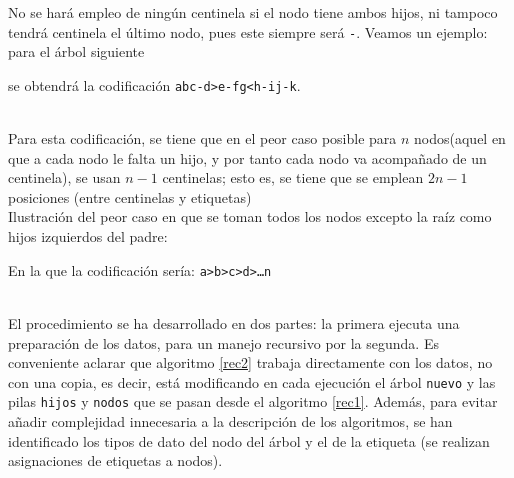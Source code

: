 \documentclass[a4paper,10pt]{scrartcl}
\begin{document}
 No se hará empleo de ningún centinela si el nodo tiene ambos hijos,
 ni tampoco tendrá centinela el último nodo, pues este 
 siempre será \texttt{-}. Veamos un ejemplo: para el árbol siguiente
 
 \begin{center}
 \begin{minipage}{20pt}
 \end{minipage}
 \end{center}
 
 se obtendrá la codificación \texttt{abc-d>e-fg<h-ij-k}.\\\ %
 
 Para esta codificación, se tiene que en el peor caso posible para
 $n$ nodos(aquel en que a cada nodo le falta un hijo, y por tanto cada nodo va acompañado
 de un centinela), se usan $n-1$ centinelas; esto es, se tiene que se
 emplean $2n-1$ posiciones (entre centinelas y etiquetas)\\
 
 Ilustración del peor caso en que se toman todos los nodos excepto la raíz como
 hijos izquierdos del padre:\\
 
 \begin{center}
 \begin{minipage}{20pt}
 \end{minipage}
 \end{center}
 
 En la que la codificación sería: \texttt{a>b>c>d>\ldots n}\\\
 
 El procedimiento se ha desarrollado en dos partes: la primera ejecuta una
 preparación de los datos, para un manejo recursivo por la segunda. Es conveniente
 aclarar que algoritmo \ref{rec2} trabaja directamente con los
 datos, no con una copia, es decir, está modificando en cada ejecución
 el árbol \texttt{nuevo} y las pilas \texttt{hijos} y \texttt{nodos} que se pasan 
 desde el algoritmo \ref{rec1}. Además, para evitar añadir complejidad
 innecesaria a la descripción de los algoritmos, se han identificado los
 tipos de dato del nodo del árbol y el de la etiqueta (se realizan asignaciones
 de etiquetas a nodos).
  
\end{document}
